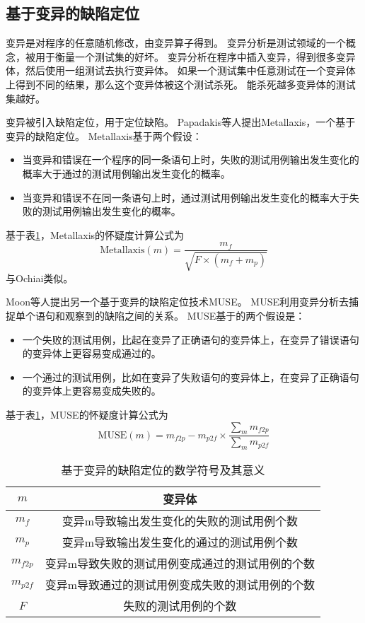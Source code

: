 \subsection{基于变异的缺陷定位}

变异是对程序的任意随机修改，由变异算子得到。
变异分析是测试领域的一个概念，被用于衡量一个测试集的好坏。
变异分析在程序中插入变异，得到很多变异体，然后使用一组测试去执行变异体。
如果一个测试集中任意测试在一个变异体上得到不同的结果，那么这个变异体被这个测试杀死。
能杀死越多变异体的测试集越好。

变异被引入缺陷定位，用于定位缺陷。
Papadakis等人提出Metallaxis\parencite{Papadakis2015Metallaxis}，一个基于变异的缺陷定位。
Metallaxis基于两个假设：
\begin{itemize}
\item 当变异和错误在一个程序的同一条语句上时，失败的测试用例输出发生变化的概率大于通过的测试用例输出发生变化的概率。
\item 当变异和错误不在同一条语句上时，通过测试用例输出发生变化的概率大于失败的测试用例输出发生变化的概率。
\end{itemize}
基于表\ref{mutant_symbol}，Metallaxis的怀疑度计算公式为
$$
\mathrm{Metallaxis}(m) = \frac{m_f}{\sqrt{F \times (m_f + m_p)}}
$$
与Ochiai类似。

Moon等人提出另一个基于变异的缺陷定位技术MUSE\parencite{Moon2014Ask}。
MUSE利用变异分析去捕捉单个语句和观察到的缺陷之间的关系。
MUSE基于的两个假设是：
\begin{itemize}
\item 一个失败的测试用例，比起在变异了正确语句的变异体上，在变异了错误语句的变异体上更容易变成通过的。
\item 一个通过的测试用例，比如在变异了失败语句的变异体上，在变异了正确语句的变异体上更容易变成失败的。
\end{itemize}
基于表\ref{mutant_symbol}，MUSE的怀疑度计算公式为
$$
\mathrm{MUSE}(m) = m_{f2p} - m_{p2f} \times \frac{\sum_{m}^{}{m_{f2p}}}{\sum_{m}^{}{m_{p2f}}}
$$

\begin{table}
\centering
\begin{tabular}{|c|c|}
\hline
$m$ & 变异体 \\
\hline
$m_f$ & 变异m导致输出发生变化的失败的测试用例个数 \\
\hline
$m_p$ & 变异m导致输出发生变化的通过的测试用例个数 \\
\hline
$m_{f2p}$ & 变异m导致失败的测试用例变成通过的测试用例的个数 \\
\hline
$m_{p2f}$ & 变异m导致通过的测试用例变成失败的测试用例的个数 \\
\hline
$F$ & 失败的测试用例的个数 \\
\hline
\end{tabular}
\caption{基于变异的缺陷定位的数学符号及其意义}
\label{mutant_symbol}
\end{table}

